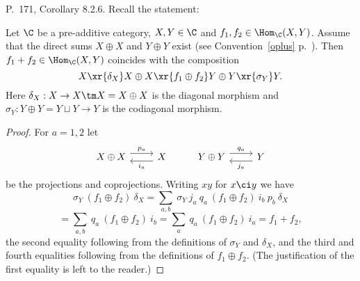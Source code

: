 \documentclass[12pt]{article}
\theoremstyle{remark}
\theoremstyle{definition}
\begin{document}

%

\begin{s}
P.~171, Corollary 8.2.6. Recall the statement: 

\begin{cor}[Corollary 8.2.6 p.~171] 
Let $\C$ be a pre-additive category, $X,Y\in\C$ and $f_1,f_2\in\Hom_\C(X,Y)$. Assume that the direct sums $X\oplus X$ and $Y\oplus Y$ exist (see Convention~\ref{oplus} p.~). Then $f_1+f_2\in\Hom_\C(X,Y)$ coincides with the composition 
$$
X\xr{\delta_X}X\oplus X\xr{f_1\oplus f_2}Y\oplus Y\xr{\sigma_Y}Y.
$$ 
Here $\delta_X:X\to X\tm X=X\oplus X$ is the diagonal morphism and $\sigma_Y:Y\oplus Y=Y\sqcup Y\to Y$ is the codiagonal morphism.
\end{cor}

\begin{proof} 
For $a=1,2$ let 
$$
\begin{tikzcd}
X\oplus X\ar[r,yshift=4pt,"p_a"]&X\ar[l,yshift=-4pt,"i_a"]&Y\oplus Y\ar[r,yshift=4pt,"q_a"]&Y\ar[l,yshift=-4pt,"j_a"]
\end{tikzcd}
$$ 
be the projections and coprojections. Writing $xy$ for $x\ci y$ we have 
$$
\sigma_Y\ (f_1\oplus f_2)\ \delta_X=\sum_{a,b}\ \sigma_Y\ j_a\ q_a\ (f_1\oplus f_2)\ i_b\ p_b\ \delta_X
$$ 
$$ 
=\sum_{a,b}\ q_a\ (f_1\oplus f_2)\ i_b=\sum_a\ q_a\ (f_1\oplus f_2)\ i_a=f_1+f_2,
$$ 
the second equality following from the definitions of $\sigma_Y$ and $\delta_X$, and the third and fourth equalities following from the definitions of $f_1\oplus f_2$. (The justification of the first equality is left to the reader.)
\end{proof}
\end{s}

%
\end{document}
